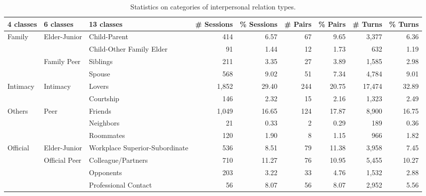 \documentclass[letterpaper]{article} \usepackage{aaai21}  \usepackage{times}  \usepackage{helvet} \usepackage{courier}  \usepackage[hyphens]{url}  \usepackage{graphicx} \usepackage{xcolor}
\begin{document}
\begin{table*}[t]
	\centering
	\small
	\begin{tabular}{@{}lllrrrrrr@{}}
		\toprule[1.5pt]
		\textbf{4 classes} & \textbf{6 classes} & \textbf{13 classes}  & \textbf{\# Sessions} & \textbf{\% Sessions}& \textbf{\# Pairs} & \textbf{\% Pairs} & \textbf{\# Turns} & \textbf{\% Turns}  \\ 
		\hline
		\multirow{4}{*}{Family}&\multirow{2}{*}{Elder-Junior} & Child-Parent   &  414    &   6.57   &  67   &	9.65	&  3,377 & 6.36   \\
		& & Child-Other Family Elder 															    &   91   &  1.44    &  12   &	1.73	&   632  & 1.19  \\
		& \multirow{2}{*}{Family Peer} & Siblings 														  &   211   &   3.35   &  27   &   3.89	&   1,585  & 2.98 \\
		& & Spouse 																						   &   568   &   9.02   &  51   &	 7.34  &   4,784  & 9.01 \\
		\hline
		\multirow{2}{*}{Intimacy}& \multirow{2}{*}{Intimacy} &  Lovers					&  1,852    &  29.40    &  244   &20.75	&   17,474 & 32.89  \\
		& & Courtship	
		&  146    &   2.32   &  15   & 2.16	&  1,323 & 2.49   \\
		\hline
		\multirow{3}{*}{Others}& \multirow{3}{*}{Peer} & Friends 					&  1,049    & 16.65     &  124   &17.87	&  8,900 & 16.75    \\
		& &Neighbors 																					 &   21   &  0.33    &  2   &	0.29& 189 & 0.36      \\
		& &Roommates 																				    &  120    &   1.90   &  8   & 1.15	&   966 & 1.82   \\
		
		
		\hline
		\multirow{4}{*}{Official}& \multirow{1}{*}{Elder-Junior} &Workplace Superior-Subordinate &  536    &   8.51   &  79   &	11.38& 3,958 & 7.45     \\
		&\multirow{3}{*}{Official Peer} &Colleague/Partners										&   710   &  11.27    &  76   &	10.95 & 5,455 & 10.27     \\
		& &Opponents																				  &  203   &  3.22    &  33   &  4.76	&  1,532 & 2.88   \\
		& &Professional Contact																	  &   56   &  8.07    &  56   &	8.07 & 2,952 & 5.56     \\
		
		\bottomrule[1.5pt]
		
	\end{tabular}
	\caption{Statistics on categories of interpersonal relation types.}
	\label{table:relationtypes}
\end{table*}
\end{document}
